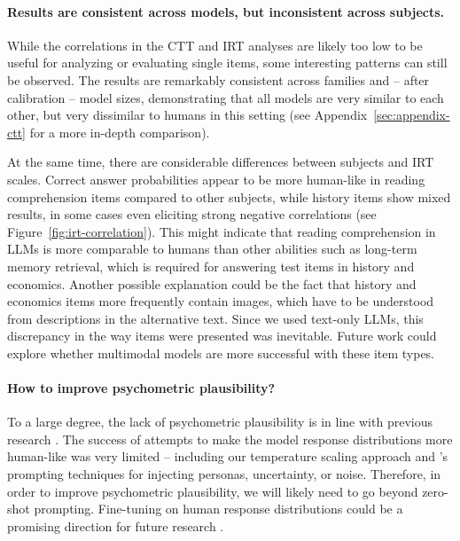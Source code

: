 \documentclass[11pt]{article}
\begin{document}
\paragraph{Results are consistent across models, but inconsistent across subjects.}

While the correlations in the CTT and IRT analyses are likely too low to be useful for analyzing or evaluating single items, some interesting patterns can still be observed. The results are remarkably consistent across families and -- after calibration -- model sizes, demonstrating that all models are very similar to each other, but very dissimilar to humans in this setting (see Appendix~\ref{sec:appendix-ctt} for a more in-depth comparison).

At the same time, there are considerable differences between subjects and IRT scales. Correct answer probabilities appear to be more human-like in reading comprehension items compared to other subjects, while history items show mixed results, in some cases even eliciting strong negative correlations (see Figure~\ref{fig:irt-correlation}). This might indicate that reading comprehension in LLMs is more comparable to humans than other abilities such as long-term memory retrieval, which is required for answering test items in history and economics. Another possible explanation could be the fact that history and economics items more frequently contain images, which have to be understood from descriptions in the alternative text. Since we used text-only LLMs, this discrepancy in the way items were presented was inevitable. Future work could explore whether multimodal models are more successful with these item types.

\paragraph{How to improve psychometric plausibility?}

To a large degree, the lack of psychometric plausibility is in line with previous research \citep{Hayakawa2024,Zotos2025}. The success of attempts to make the model response distributions more human-like was very limited -- including our temperature scaling approach and \citeauthor{Hayakawa2024}'s \citeyearpar{Hayakawa2024} prompting techniques for injecting personas, uncertainty, or noise. Therefore, in order to improve psychometric plausibility, we will likely need to go beyond zero-shot prompting. Fine-tuning on human response distributions could be a promising direction for future research \citep[cf.][]{Chen2024}.
\end{document}
